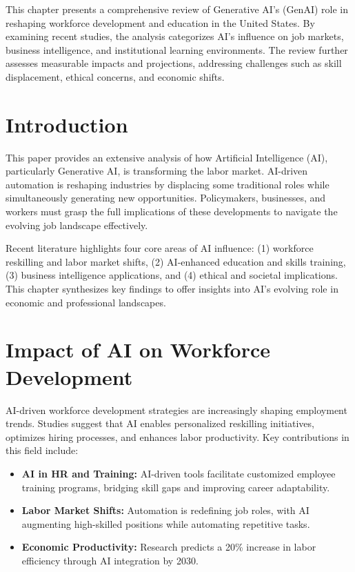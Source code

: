 \documentclass[a4paper,headinclude=on,footinclude=on,12pt,oneside]{scrbook}
\begin{document}
This chapter presents a comprehensive review of Generative AI's (GenAI) role in reshaping workforce development and education in the United States. By examining recent studies, the analysis categorizes AI's influence on job markets, business intelligence, and institutional learning environments. The review further assesses measurable impacts and projections, addressing challenges such as skill displacement, ethical concerns, and economic shifts.

\section*{Introduction}

This paper provides an extensive analysis of how Artificial Intelligence (AI), particularly Generative AI, is transforming the labor market. AI-driven automation is reshaping industries by displacing some traditional roles while simultaneously generating new opportunities. Policymakers, businesses, and workers must grasp the full implications of these developments to navigate the evolving job landscape effectively.

Recent literature highlights four core areas of AI influence: (1) workforce reskilling and labor market shifts, (2) AI-enhanced education and skills training, (3) business intelligence applications, and (4) ethical and societal implications. This chapter synthesizes key findings to offer insights into AI’s evolving role in economic and professional landscapes.

\section*{Impact of AI on Workforce Development}

AI-driven workforce development strategies are increasingly shaping employment trends. Studies suggest that AI enables personalized reskilling initiatives, optimizes hiring processes, and enhances labor productivity. Key contributions in this field include:
\begin{itemize}
	\item \textbf{AI in HR and Training:} AI-driven tools facilitate customized employee training programs, bridging skill gaps and improving career adaptability.
	\item \textbf{Labor Market Shifts:} Automation is redefining job roles, with AI augmenting high-skilled positions while automating repetitive tasks.
	\item \textbf{Economic Productivity:} Research predicts a 20\% increase in labor efficiency through AI integration by 2030.
\end{itemize}
\end{document}
